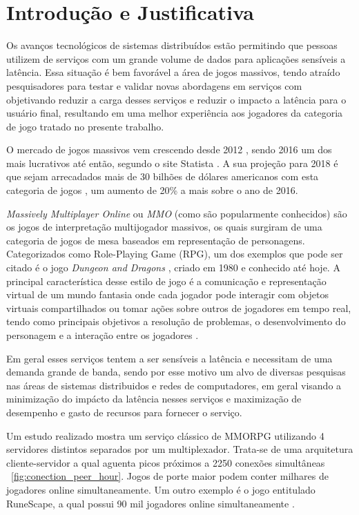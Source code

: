 \section{Introdução e Justificativa}
\label{sec:int}

Os avanços tecnológicos de sistemas distribuídos estão permitindo que pessoas utilizem de serviços com um grande volume de dados para aplicações sensíveis a latência. Essa situação é bem favorável a área de jogos massivos, tendo atraído pesquisadores para testar e validar novas abordagens em serviços com objetivando reduzir a carga desses serviços e reduzir o impacto a latência para o usuário final, resultando em uma melhor experiência aos jogadores da categoria de jogo tratado no presente trabalho\cite{mmo_analytic}.

O mercado de jogos massivos vem crescendo desde 2012 \cite{new_york_times}, sendo 2016 um dos mais lucrativos até então, segundo o site Statista \cite{statista_2016}. A sua projeção para 2018 é que sejam arrecadados mais de 30 bilhões de dólares americanos com esta categoria de jogos \cite{statista_2018}, um aumento de 20\% a mais sobre o ano de 2016.

\textit{Massively Multiplayer Online} ou \textit{MMO} (como são popularmente conhecidos) são os jogos de interpretação multijogador massivos, os quais surgiram de uma categoria de jogos de mesa baseados em representação de personagens. Categorizados como Role-Playing Game (RPG), um dos exemplos que pode ser citado é o jogo \textit{Dungeon and Dragons} \cite{tsr1980dungeons},  criado em 1980 e conhecido até hoje. A principal característica desse estilo de jogo é a comunicação e representação virtual de um mundo fantasia onde cada jogador pode interagir com objetos virtuais compartilhados ou tomar ações sobre outros de jogadores em tempo real, tendo como principais objetivos a resolução de problemas, o desenvolvimento do personagem e a interação entre os jogadores \cite{video_game_technologies}.

Em geral esses serviços tentem a ser sensíveis a latência e necessitam de uma demanda grande de banda, sendo por esse motivo um alvo de diversas pesquisas nas áreas de sistemas distribuidos e redes de computadores, em geral visando a minimização do impácto da latência nesses serviços\cite{stephenclarkewillson2017} e maximização de desempenho e gasto de recursos para fornecer o serviço.

Um estudo realizado \cite{system_performance} mostra um serviço clássico de MMORPG utilizando 4 servidores distintos separados por um multiplexador. Trata-se de uma arquitetura cliente-servidor a qual aguenta picos próximos a 2250 conexões simultâneas ~\ref{fig:conection_peer_hour}. Jogos de porte maior podem conter milhares de jogadores online simultaneamente. Um outro exemplo é o jogo entitulado RuneScape, a qual possui 90 mil jogadores online simultaneamente \cite{runescape_online_users}.


